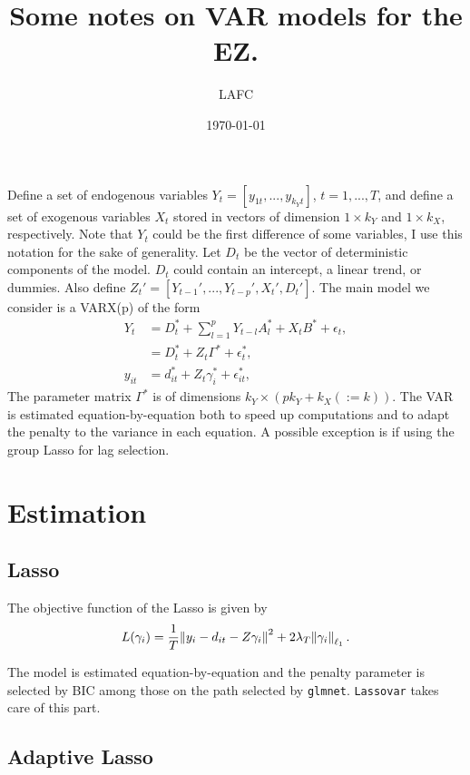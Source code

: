 \documentclass[11pt,oneside, a4paper]{amsart}\usepackage[]{graphicx}\usepackage[]{color}
\begin{document}
	
\title{Some notes on VAR models for the EZ.}   
\author{LAFC}
\date{\today}
\maketitle

Define a set of endogenous variables $Y_t=[y_{1t},...,y_{k_Y t}]$, $t=1,...,T$, and define a set of exogenous variables $X_t$ stored in vectors of dimension $1\times k_Y$ and $1\times k_X$, respectively. Note that $Y_t$ could be the first difference of some variables, I use this notation for the sake of generality. Let $D_t$ be the vector of deterministic components of the model. $D_t$ could contain an intercept, a linear trend, or dummies. Also define $Z_t'=[Y_{t-1}',...,Y_{t-p}',X_{t}',D_t']$. The main model we consider is a VARX(p) of the form
\begin{align}
 Y_t &= D_t^* + \sum_{l=1}^p  Y_{t-l}A_l^* + X_t B^* + \epsilon_t,\nonumber\\
    &= D_t^* + Z_t \Gamma^* + \epsilon_t^*,\nonumber\\
 y_{it}&= d_{it}^* + Z_{t} \gamma_i^* + \epsilon_{it}^*,\label{eq:var}
\end{align}
The parameter matrix $\Gamma^*$ is of dimensions $ k_Y \times \left(pk_Y+k_X (:=k) \right)$. The VAR is estimated equation-by-equation both to speed up computations and to adapt the penalty to the variance in each equation. A possible exception is if using the group Lasso for lag selection.   


\section*{Estimation}

\subsection*{Lasso}
The objective function of the Lasso is given by 
\begin{align}
L(\gamma_{i})=\frac{1}{T}\enVert{y_{i}-d_{it}-Z\gamma_{i}}^2+2\lambda_T\enVert{\gamma_{i}}_{\ell_1}\label{eq:obj}.
\end{align}

The model is estimated equation-by-equation and the penalty parameter is selected by BIC among those on the path selected by \texttt{glmnet}. \texttt{Lassovar} takes care of this part.  

\subsection*{Adaptive Lasso}
\end{document}
